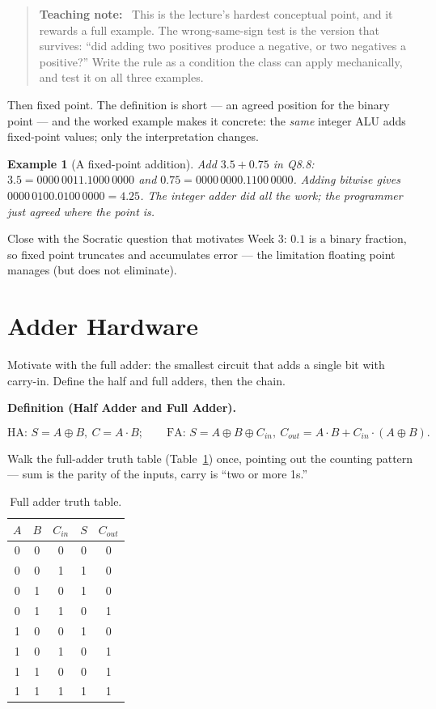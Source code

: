 \documentclass[11pt]{article}
\newtheorem{example}{Example}[section]
\newenvironment{definitionbox}[1]{%
  \par\noindent\textbf{Definition (#1).}\ \itshape
}{\par\vspace{0.3em}}
\newenvironment{teachingaside}{\begin{quote}\small\color{primary-gold}\textbf{Teaching note:}\ }{\end{quote}}
\begin{document}
\begin{teachingaside}
This is the lecture's hardest conceptual point, and it rewards a full example. The wrong-same-sign test is the version that survives: ``did adding two positives produce a negative, or two negatives a positive?'' Write the rule as a condition the class can apply mechanically, and test it on all three examples.
\end{teachingaside}

Then fixed point. The definition is short --- an agreed position for the binary point --- and the worked example makes it concrete: the \emph{same} integer ALU adds fixed-point values; only the interpretation changes.

\begin{example}[A fixed-point addition]
Add $3.5 + 0.75$ in Q8.8: $3.5 = 0000\,0011.1000\,0000$ and $0.75 = 0000\,0000.1100\,0000$. Adding bitwise gives $0000\,0100.0100\,0000 = 4.25$. The integer adder did all the work; the programmer just agreed where the point is.
\end{example}

Close with the Socratic question that motivates Week 3: $0.1$ is a  binary fraction, so fixed point truncates and accumulates error --- the limitation floating point manages (but does not eliminate).

\section{Adder Hardware}

Motivate with the full adder: the smallest circuit that adds a single bit with carry-in. Define the half and full adders, then the chain.

\begin{definitionbox}{Half Adder and Full Adder}
\[
  \text{HA: } S = A \oplus B, \ C = A\cdot B; \qquad
  \text{FA: } S = A \oplus B \oplus C_{in}, \ C_{out} = A\cdot B + C_{in}\cdot(A\oplus B).
\]
\end{definitionbox}

Walk the full-adder truth table (Table~\ref{tab:fa}) once, pointing out the counting pattern --- sum is the parity of the inputs, carry is ``two or more 1s.''

\begin{table}[h]
\centering
\small
\begin{tabular}{@{}ccc|cc@{}}
\toprule
$A$ & $B$ & $C_{in}$ & $S$ & $C_{out}$ \\
\midrule
0 & 0 & 0 & 0 & 0 \\
0 & 0 & 1 & 1 & 0 \\
0 & 1 & 0 & 1 & 0 \\
0 & 1 & 1 & 0 & 1 \\
1 & 0 & 0 & 1 & 0 \\
1 & 0 & 1 & 0 & 1 \\
1 & 1 & 0 & 0 & 1 \\
1 & 1 & 1 & 1 & 1 \\
\bottomrule
\end{tabular}
\caption{Full adder truth table.}
\label{tab:fa}
\end{table}
\end{document}

